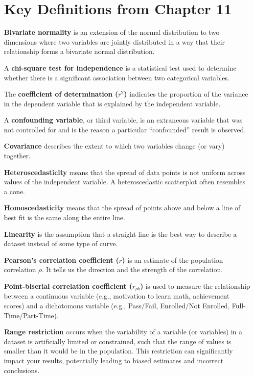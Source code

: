 \documentclass[
  letterpaper,
  DIV=11,
  numbers=noendperiod]{scrreprt}
\begin{document}
\section*{Key Definitions from Chapter
11}\label{key-definitions-from-chapter-11}


\textbf{Bivariate normality} is an extension of the normal distribution
to two dimensions where two variables are jointly distributed in a way
that their relationship forms a bivariate normal distribution.

A \textbf{chi-square test for independence} is a statistical test used
to determine whether there is a significant association between two
categorical variables.

The \textbf{coefficient of determination (\(r^2\))} indicates the
proportion of the variance in the dependent variable that is explained
by the independent variable.

A \textbf{confounding variable}, or third variable, is an extraneous
variable that was not controlled for and is the reason a particular
``confounded'' result is observed.

\textbf{Covariance} describes the extent to which two variables change
(or vary) together.

\textbf{Heteroscedasticity} means that the spread of data points is not
uniform across values of the independent variable. A heteroscedastic
scatterplot often resembles a cone.

\textbf{Homoscedasticity} means that the spread of points above and
below a line of best fit is the same along the entire line.

\textbf{Linearity} is the assumption that a straight line is the best
way to describe a dataset instead of some type of curve.

\textbf{Pearson's correlation coefficient (\(r\))} is an estimate of the
population correlation \(\rho\). It tells us the direction and the
strength of the correlation.

\textbf{Point-biserial correlation coefficient (\(r_{pb}\))} is used to
measure the relationship between a continuous variable (e.g., motivation
to learn math, achievement scores) and a dichotomous variable (e.g.,
Pass/Fail, Enrolled/Not Enrolled, Full-Time/Part-Time).

\textbf{Range restriction} occurs when the variability of a variable (or
variables) in a dataset is artificially limited or constrained, such
that the range of values is smaller than it would be in the population.
This restriction can significantly impact your results, potentially
leading to biased estimates and incorrect conclusions.
\end{document}
